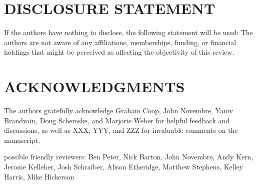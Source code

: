 \documentclass{ar-1col}
\begin{document}
\section*{DISCLOSURE STATEMENT}
If the authors have nothing to disclose, the following statement will be used: 
The authors are not aware of any affiliations, memberships, funding, or financial holdings 
that might be perceived as affecting the objectivity of this review.

\section*{ACKNOWLEDGMENTS}
The authors gratefully acknowledge 
Graham Coop, John Novembre, 
Yaniv Brandvain, Doug Schemske, and Marjorie Weber 
for helpful feedback and discussions, 
as well as XXX, YYY, and ZZZ for invaluable comments on the manuscript.



possible friendly reviewers: 
{Ben Peter, Nick Barton, John Novembre, 
Andy Kern, Jerome Kelleher, Josh Schraiber,
Alison Etheridge, Matthew Stephens, Kelley Harris, 
Mike Hickerson}



\end{document}
